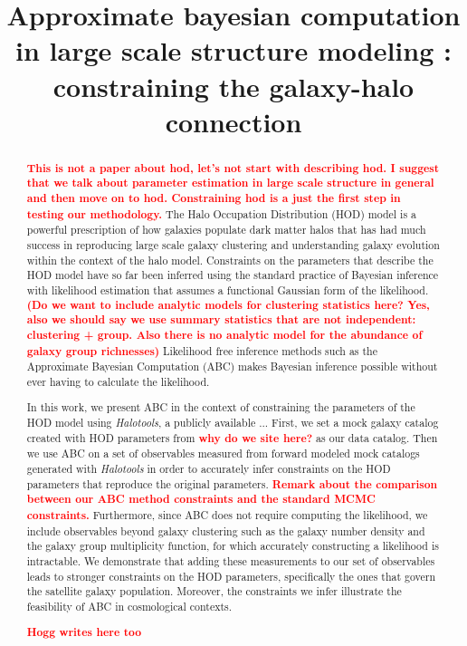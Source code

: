 \newcommand{\todo}[1]{{\bf \textcolor{red}{ #1}}}
\newcommand{\beq}{\begin{equation}}
\newcommand{\eeq}{\end{equation}}
\newcommand{\lang}{\langle}
\newcommand{\ra}{\rangle}
\newcommand{\vep}{\bm{\epsilon}}
\newcommand{\ep}{\epsilon}
\newcommand{\pars}{\vec{\theta}}
\newcommand{\dev}{\mathrm{d}}


\title{Approximate bayesian computation in large scale structure modeling : constraining the galaxy-halo connection}
\begin{abstract}
\todo{This is not a paper about hod, let's not start with describing hod. I suggest that we talk about parameter estimation in large scale structure in general and then move on to hod. Constraining hod is a just the first step in testing our methodology.} The Halo Occupation Distribution (HOD) model is a powerful prescription of how galaxies
populate dark matter halos that has had much success in reproducing large scale galaxy
clustering and understanding galaxy evolution within the context of the halo model.
Constraints on the parameters that describe the HOD model have so far been inferred using 
the standard practice of Bayesian inference with likelihood estimation that assumes a
functional Gaussian form of the likelihood.\todo{(Do we want to include analytic models for clustering statistics here? Yes, also we should say we use summary statistics that are not independent: clustering + group. Also there is no analytic model for the abundance of galaxy group richnesses)}  %
Likelihood free inference methods such as the
Approximate Bayesian Computation (ABC) makes Bayesian inference possible without ever 
having to calculate the likelihood. 

In this work, we present ABC in the context of constraining the parameters of the HOD model
using {\it Halotools}, a publicly available ... First, we set a mock galaxy catalog created
with HOD parameters from \cite{Zheng:2007aa} \todo{why do we site here?} as our data catalog. Then we use ABC on a set 
of observables measured from forward modeled mock catalogs generated with {\it Halotools} 
in order to accurately infer constraints on the HOD parameters that 
reproduce the original parameters. \todo{Remark about the comparison between our ABC 
method constraints and the standard MCMC constraints.} Furthermore, since ABC does 
not require computing the likelihood, we include observables beyond galaxy clustering 
such as the galaxy number density and the galaxy group multiplicity function, for which
accurately constructing a likelihood is intractable. 
We demonstrate that adding these measurements to our set of observables leads to stronger
constraints on the HOD parameters, specifically the ones that govern the satellite galaxy
population. Moreover, the constraints we infer illustrate the feasibility of ABC in 
cosmological contexts.

\todo{Hogg writes here too}

\end{abstract}

